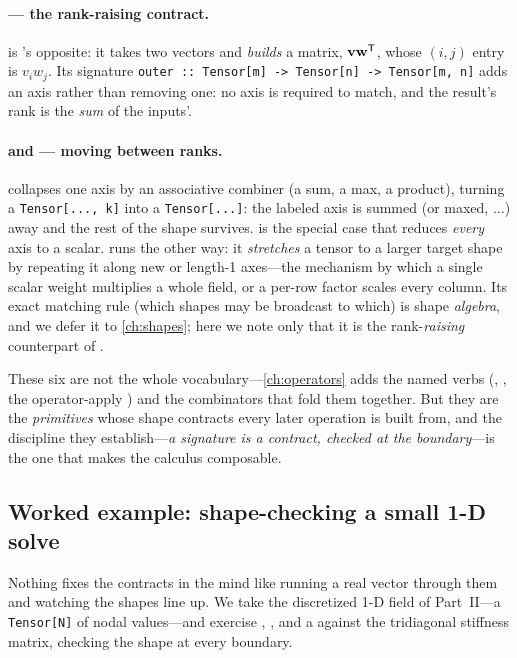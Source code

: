 \paragraph{ --- the rank-raising contract.}
 is 's opposite: it takes two vectors and
\emph{builds} a matrix, $\mathbf{v}\mathbf{w}^{\mathsf T}$, whose $(i,j)$ entry is $v_i w_j$.
Its signature \lstinline[style=l4style]|outer :: Tensor[m] -> Tensor[n] -> Tensor[m, n]|
adds an axis rather than removing one: no axis is required to match, and the
result's rank is the \emph{sum} of the inputs'.

\paragraph{ and  --- moving between ranks.}
 collapses one axis by an associative combiner (a sum, a max, a
product), turning a \lstinline[style=l4style]|Tensor[..., k]| into a
\lstinline[style=l4style]|Tensor[...]|: the labeled axis is summed (or
maxed, $\dots$) away and the rest of the shape survives.  is the
special case that reduces \emph{every} axis to a scalar.  runs the
other way: it \emph{stretches} a tensor to a larger target shape by repeating it
along new or length-1 axes---the mechanism by which a single scalar weight
multiplies a whole field, or a per-row factor scales every column. Its exact
matching rule (which shapes may be broadcast to which) is shape \emph{algebra},
and we defer it to \cref{ch:shapes}; here we note only that it is the
rank-\emph{raising} counterpart of .

\begin{notationbox}
These six are not the whole vocabulary---\cref{ch:operators} adds the named
verbs (, , the operator-apply ) and the
combinators that fold them together. But they are the \emph{primitives} whose
shape contracts every later operation is built from, and the discipline they
establish---\emph{a signature is a contract, checked at the boundary}---is the one
that makes the calculus composable.
\end{notationbox}

\subsection{Worked example: shape-checking a small 1-D solve}
\label{sec:t-wex-shapes}

Nothing fixes the contracts in the mind like running a real vector through them
and watching the shapes line up. We take the discretized 1-D field of Part~II---a
\lstinline[style=l4style]|Tensor[N]| of nodal values---and exercise ,
, and a  against the tridiagonal stiffness matrix, checking
the shape at every boundary.

